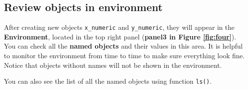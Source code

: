 \documentclass[
]{book}
\begin{document}
\hypertarget{review-objects-in-environment}{%
\subsection{Review objects in environment}\label{review-objects-in-environment}}

After creating new objects \texttt{x\_numeric} and \texttt{y\_numeric}, they will appear in the \textbf{Environment}, located in the top right panel (\textbf{panel3 in Figure \ref{fig:four}}). You can check all the \textbf{named objects} and their values in this area. It is helpful to monitor the environment from time to time to make sure everything look fine. Notice that objects without names will not be shown in the environment.

You can also see the list of all the named objects using function \texttt{ls()}.
\end{document}
